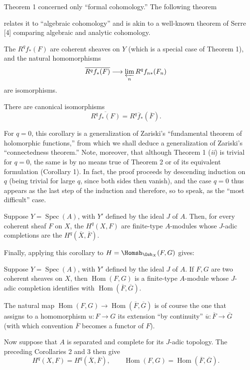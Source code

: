Theorem 1 concerned only “formal cohomology.” The following theorem

relates it to “algebraic cohomology” and is akin to a well-known theorem of
Serre [4] comparing algebraic and analytic cohomology.

 The $R^{q}f_{*}(F)$ are
coherent sheaves on $Y$ (which is a special case of Theorem 1), and the natural
homomorphisms
\[
  \overline{R^{q}f_{*}(F)}
  \longrightarrow \varprojlim_n R^{q}f_{n*}(F_n)
\]
are isomorphisms.

 There are canonical isomorphisms
\[
  \overline{R^{q}f_{*}(F)}=R^{q}\overline f_{*}(\overline F).
\]

For $q=0$, this corollary is a generalization of Zariski's “fundamental theorem
of holomorphic functions,” from which we shall deduce a generalization of
Zariski's “connectedness theorem.” Note, moreover, that although Theorem 1
(\textit{ii}) is trivial for $q=0$, the same is by no means true of Theorem 2
or of its equivalent formulation (Corollary 1). In fact, the proof proceeds by
descending induction on $q$ (being trivial for large $q$, since both sides then
vanish), and the case $q=0$ thus appears as the last step of the induction and
therefore, so to speak, as the “most difficult” case.

 Suppose $Y=\operatorname{Spec}(A)$, with $Y'$ defined by
the ideal $J$ of $A$. Then, for every coherent sheaf $F$ on $X$, the
$H^{q}(X,F)$ are finite-type $A$-modules whose $J$-adic completions are the
$H^{q}(\overline X,\overline F)$.

Finally, applying this corollary to
$H=\Homsh_{\Osh_X}(F,G)$ gives:

 Suppose $Y=\operatorname{Spec}(A)$, with $Y'$ defined by
the ideal $J$ of $A$. If $F,G$ are two coherent sheaves on $X$, then
$\operatorname{Hom}(F,G)$ is a finite-type $A$-module whose $J$-adic
completion identifies with
$\operatorname{Hom}(\overline F,\overline G)$.

The natural map
$\operatorname{Hom}(F,G)\longrightarrow
\operatorname{Hom}(\overline F,\overline G)$ is of course the one that assigns
to a homomorphism $u:F\longrightarrow G$ its extension “by continuity”
$\overline u:\overline F\longrightarrow\overline G$ (with which convention
$\overline F$ becomes a functor of $F$).

Now suppose that $A$ is separated and complete for its $J$-adic topology. The
preceding Corollaries 2 and 3 then give
\[
  H^{q}(X,F)=H^{q}(\overline X,\overline F),
  \qquad
  \operatorname{Hom}(F,G)
  =\operatorname{Hom}(\overline F,\overline G).
\]

